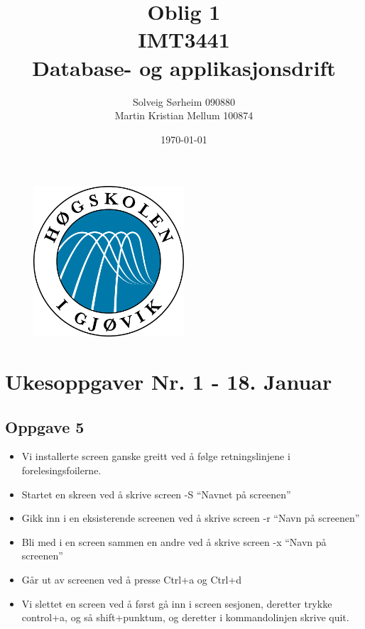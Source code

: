 \documentclass[a4paper, norsk, 12pt]{article}
\title{Oblig 1 \\ IMT3441 \\ Database- og applikasjonsdrift}
\author{Solveig Sørheim 090880 \\ Martin Kristian Mellum 100874}
\date{\today}
\begin{document}
\begin{figure}[h!]
 \centering
  \includegraphics[width=0.5\textwidth]{Images/hig_logo.png}
 \maketitle       %
\end{figure}
\pagebreak
\tableofcontents %
\pagebreak	%

\section{Ukesoppgaver Nr. 1 - 18. Januar}
\subsection{Oppgave 5}
\begin{itemize}
\item Vi installerte screen ganske greitt ved å følge retningslinjene i forelesingsfoilerne.
\item Startet en skreen ved å skrive screen -S “Navnet på screenen”
\item Gikk inn i en eksisterende screenen ved å skrive screen -r “Navn på screenen”
\item Bli med i en screen sammen en andre ved å skrive screen -x “Navn på screenen”
\item Går ut av screenen ved å presse Ctrl+a og Ctrl+d
\item Vi slettet en screen ved å først gå inn i screen sesjonen, deretter trykke control+a, og så shift+punktum, og deretter i kommandolinjen skrive quit.
\end{itemize}
\end{document}
